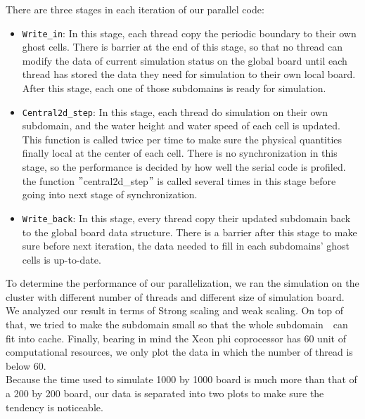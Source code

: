 \documentclass[11pt]{article}
\begin{document}
        There are three stages in each iteration of our parallel code:
        \begin{itemize}
            \item \texttt{Write\_in}: In this stage, each thread copy the periodic boundary to their own ghost cells.
            There is barrier at the end of this stage, so that no thread can modify the data of current simulation
            status on the global board until each thread has stored the data they need for simulation to their own
            local board. After this stage, each one of those subdomains is ready for simulation.
            \item \texttt{Central2d\_step}: In this stage, each thread do simulation on their own subdomain, and the
            water height and water speed of each cell is updated. This function is called twice per time to make sure
            the physical quantities finally local at the center of each cell. There is no synchronization in this stage,
            so the performance is decided by how well the serial code is profiled. the function $"$central2d\_step$"$
            is called several times in this stage before going into next stage of synchronization.
            \item \texttt{Write\_back}: In this stage, every thread copy their updated subdomain back to the global
            board data structure. There is a barrier after this stage to make sure before next iteration, the data 
            needed to fill in each subdomains' ghost cells is up-to-date.
        \end{itemize}

		To determine the performance of our parallelization, we ran the simulation on the cluster with different number
        of threads and different size of simulation board. We analyzed our result in terms of Strong scaling and weak
        scaling. On top of that, we tried to make the subdomain small so that the whole subdomain　can fit into cache.
        Finally, bearing in mind the Xeon phi coprocessor has 60 unit of computational resources, we only plot the data
        in which the number of thread is below 60. \\
        
        Because the time used to simulate 1000 by 1000 board is much more than that of a 200 by 200 board, our data
        is separated into two plots to make sure the tendency is noticeable.
        
        \clearpage
        \vspace{0.5cm}
        
\end{document}
